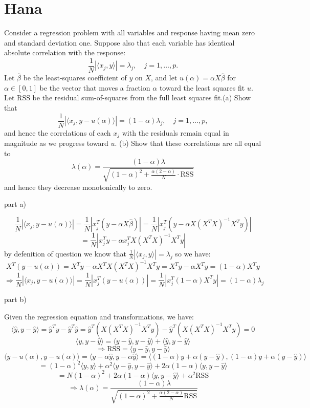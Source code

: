 \section{Hana}

Consider a regression problem with all variables and response having mean zero and standard deviation one. Suppose also that each variable has identical absolute correlation with the response:
\[
\frac{1}{N} | \langle x_j, y \rangle | = \lambda_j, \quad j = 1, \ldots, p.
\]
Let $\hat{\beta}$ be the least-squares coefficient of $y$ on $X$, and let $u(\alpha) = \alpha X \hat{\beta}$ for $\alpha \in [0, 1]$ be the vector that moves a fraction $\alpha$ toward the least squares fit $u$. Let $\text{RSS}$ be the residual sum-of-squares from the full least squares fit.(a) Show that 
\[
\frac{1}{N} | \langle x_j, y - u(\alpha) \rangle | = (1 - \alpha) \lambda_j, \quad j = 1, \ldots, p,
\]
and hence the correlations of each $x_j$ with the residuals remain equal in magnitude as we progress toward $u$. (b) Show that these correlations are all equal to
\[
\lambda(\alpha) = \frac{(1 - \alpha) \lambda}{\sqrt{(1 - \alpha)^2 + \frac{\alpha(2 - \alpha)}{N} \cdot \text{RSS}}}
\]
and hence they decrease monotonically to zero.
\begin{qsolve}
	part a)
	\begin{qsolve}[]
		$$		
		\frac{1}{N} | \langle x_j, y - u(\alpha) \rangle | = \frac{1}{N} | x_j^T(y - \alpha X \hat{\beta}) | = \frac{1}{N} | x_j^T(y-\alpha X(X^TX)^{-1}X^Ty)|
		$$
		$$
		= \frac{1}{N} | x_j^Ty - \alpha x_j^TX (X^TX)^{-1}X^Ty | 
		$$
		by defenition of question we know that $\frac{1}{N} | \langle x_j, y \rangle | = \lambda_j$ so we have:
		$$
		X^T(y-u(\alpha)) = X^Ty - \alpha X^TX(X^TX)^{-1}X^Ty = X^Ty - \alpha X^Ty = (1-\alpha)X^Ty
		$$
		$$
		\Rightarrow \frac{1}{N} | \langle x_j, y - u(\alpha) \rangle | = \frac{1}{N} | x_j^T(y - u(\alpha)) | = \frac{1}{N} | x_j^T(1-\alpha)X^Ty | = (1-\alpha) \lambda_j
		$$
	\end{qsolve}
	part b)
	\begin{qsolve}[]
		Given the regression equation and transformations, we have:
		$$
		\langle\hat{y}, y - \hat{y}\rangle = \hat{y}^T y - \hat{y}^T \hat{y} = \hat{y}^T (X(X^TX)^{-1}X^Ty) - \hat{y}^T (X(X^TX)^{-1}X^T y) = 0
		$$
		$$
		\langle y, y - \hat{y} \rangle = \langle y - \hat{y}, y - \hat{y}\rangle + \langle \hat{y}, y - \hat{y}\rangle
		$$
		$$
		\Rightarrow \text{RSS} = \langle y - \hat{y}, y - \hat{y}\rangle
		$$
		\splitqsolve[\splitqsolve]
		$$
		\langle y - u(\alpha), y - u(\alpha)\rangle = \langle y - \alpha \hat{y}, y - \alpha \hat{y}\rangle = \langle (1-\alpha) y + \alpha(y-\hat{y}), (1-\alpha) y + \alpha(y-\hat{y})\rangle
		$$
		$$
		= (1-\alpha)^2 \langle y, y\rangle + \alpha^2 \langle y-\hat{y}, y-\hat{y}\rangle + 2\alpha(1-\alpha) \langle y, y-\hat{y}\rangle
		$$
		$$
		= N(1-\alpha)^2 +2\alpha(1-\alpha) \langle y, y-\hat{y}\rangle + \alpha^2 \text{RSS}
		$$
		$$
		\Rightarrow \lambda(\alpha) = \frac{(1-\alpha)\lambda}{\sqrt{(1-\alpha)^2 + \frac{\alpha(2-\alpha)}{N} \text{RSS}}}
		$$
	\end{qsolve}
\end{qsolve}